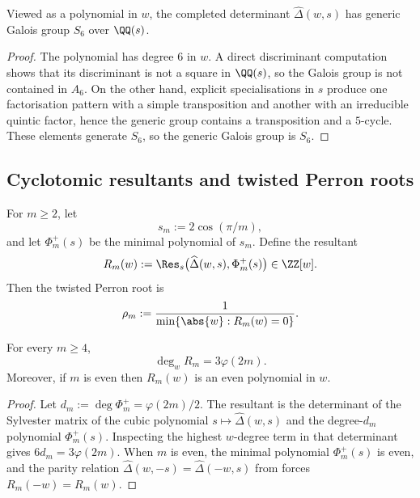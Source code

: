 \begin{proposition}
  \label{prop:sync-hatdelta-galois-s6-generic}
  Viewed as a polynomial in $w$, the completed determinant
  $\widehat\Delta(w,s)$ has generic Galois group $S_6$ over $\QQ(s)$.
\end{proposition}

\begin{proof}
  The polynomial has degree $6$ in $w$. A direct discriminant
  computation shows that its discriminant is not a square in $\QQ(s)$,
  so the Galois group is not contained in $A_6$. On the other hand,
  explicit specialisations in $s$ produce one factorisation pattern with
  a simple transposition and another with an irreducible quintic factor,
  hence the generic group contains a transposition and a $5$-cycle.
  These elements generate $S_6$, so the generic Galois group is $S_6$.
\end{proof}

\subsection{Cyclotomic resultants and twisted Perron roots}

For $m\ge 2$, let
\[
  s_m:=2\cos(\pi/m),
\]
and let $\Phi_m^+(s)$ be the minimal polynomial of $s_m$. Define the
resultant
\[
  R_m(w):=\Res_s\bigl(\widehat\Delta(w,s),\Phi_m^+(s)\bigr)\in\ZZ[w].
\]
Then the twisted Perron root is
\[
  \rho_m:=\frac{1}{\min\{\abs{w}:R_m(w)=0\}}.
\]

\begin{theorem}
  \label{thm:sync-cyclotomic-degree-law}
  For every $m\ge 4$,
  \[
    \deg_w R_m=3\varphi(2m).
  \]
  Moreover, if $m$ is even then $R_m(w)$ is an even polynomial in $w$.
\end{theorem}

\begin{proof}
  Let $d_m:=\deg \Phi_m^+=\varphi(2m)/2$. The resultant is the
  determinant of the Sylvester matrix of the cubic polynomial
  $s\mapsto\widehat\Delta(w,s)$ and the degree-$d_m$ polynomial
  $\Phi_m^+(s)$. Inspecting the highest $w$-degree term in that
  determinant gives $6d_m=3\varphi(2m)$. When $m$ is even, the minimal
  polynomial $\Phi_m^+(s)$ is even, and the parity relation
  $\widehat\Delta(w,-s)=\widehat\Delta(-w,s)$ from
   forces $R_m(-w)=R_m(w)$.
\end{proof}

